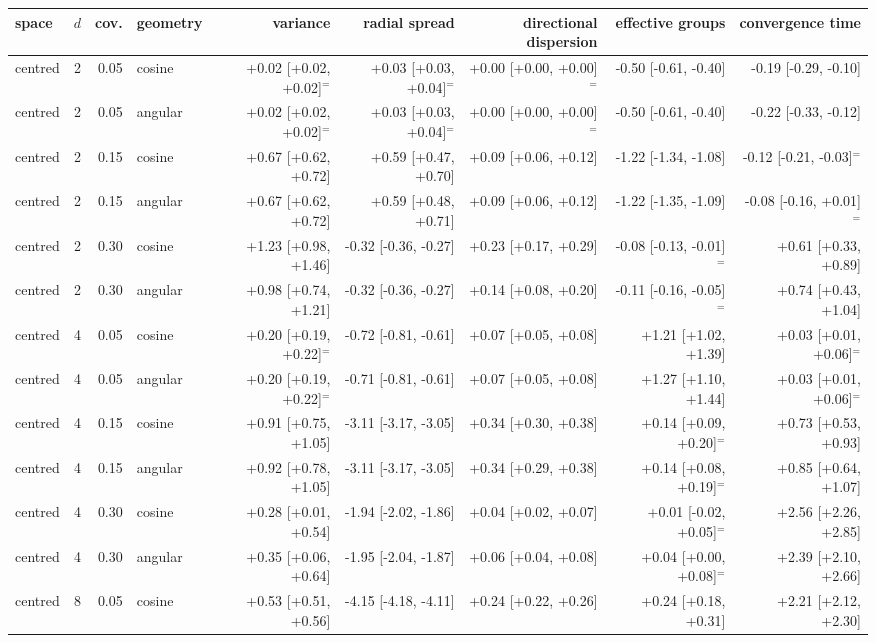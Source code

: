 \begin{tabular}{lrrlrrrrr}
\toprule
space & $d$ & cov. & geometry & variance & radial spread & directional dispersion & effective groups & convergence time \\
\midrule
centred & 2 & 0.05 & cosine & +0.02 [+0.02, +0.02]$^{=}$ & +0.03 [+0.03, +0.04]$^{=}$ & +0.00 [+0.00, +0.00]$^{=}$ & -0.50 [-0.61, -0.40] & -0.19 [-0.29, -0.10] \\
centred & 2 & 0.05 & angular & +0.02 [+0.02, +0.02]$^{=}$ & +0.03 [+0.03, +0.04]$^{=}$ & +0.00 [+0.00, +0.00]$^{=}$ & -0.50 [-0.61, -0.40] & -0.22 [-0.33, -0.12] \\
centred & 2 & 0.15 & cosine & +0.67 [+0.62, +0.72] & +0.59 [+0.47, +0.70] & +0.09 [+0.06, +0.12] & -1.22 [-1.34, -1.08] & -0.12 [-0.21, -0.03]$^{=}$ \\
centred & 2 & 0.15 & angular & +0.67 [+0.62, +0.72] & +0.59 [+0.48, +0.71] & +0.09 [+0.06, +0.12] & -1.22 [-1.35, -1.09] & -0.08 [-0.16, +0.01]$^{=}$ \\
centred & 2 & 0.30 & cosine & +1.23 [+0.98, +1.46] & -0.32 [-0.36, -0.27] & +0.23 [+0.17, +0.29] & -0.08 [-0.13, -0.01]$^{=}$ & +0.61 [+0.33, +0.89] \\
centred & 2 & 0.30 & angular & +0.98 [+0.74, +1.21] & -0.32 [-0.36, -0.27] & +0.14 [+0.08, +0.20] & -0.11 [-0.16, -0.05]$^{=}$ & +0.74 [+0.43, +1.04] \\
centred & 4 & 0.05 & cosine & +0.20 [+0.19, +0.22]$^{=}$ & -0.72 [-0.81, -0.61] & +0.07 [+0.05, +0.08] & +1.21 [+1.02, +1.39] & +0.03 [+0.01, +0.06]$^{=}$ \\
centred & 4 & 0.05 & angular & +0.20 [+0.19, +0.22]$^{=}$ & -0.71 [-0.81, -0.61] & +0.07 [+0.05, +0.08] & +1.27 [+1.10, +1.44] & +0.03 [+0.01, +0.06]$^{=}$ \\
centred & 4 & 0.15 & cosine & +0.91 [+0.75, +1.05] & -3.11 [-3.17, -3.05] & +0.34 [+0.30, +0.38] & +0.14 [+0.09, +0.20]$^{=}$ & +0.73 [+0.53, +0.93] \\
centred & 4 & 0.15 & angular & +0.92 [+0.78, +1.05] & -3.11 [-3.17, -3.05] & +0.34 [+0.29, +0.38] & +0.14 [+0.08, +0.19]$^{=}$ & +0.85 [+0.64, +1.07] \\
centred & 4 & 0.30 & cosine & +0.28 [+0.01, +0.54] & -1.94 [-2.02, -1.86] & +0.04 [+0.02, +0.07] & +0.01 [-0.02, +0.05]$^{=}$ & +2.56 [+2.26, +2.85] \\
centred & 4 & 0.30 & angular & +0.35 [+0.06, +0.64] & -1.95 [-2.04, -1.87] & +0.06 [+0.04, +0.08] & +0.04 [+0.00, +0.08]$^{=}$ & +2.39 [+2.10, +2.66] \\
centred & 8 & 0.05 & cosine & +0.53 [+0.51, +0.56] & -4.15 [-4.18, -4.11] & +0.24 [+0.22, +0.26] & +0.24 [+0.18, +0.31] & +2.21 [+2.12, +2.30] \\

\end{tabular}
